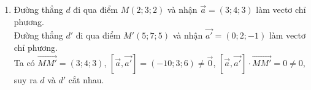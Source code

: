 \begin{vd}
{\begin{enumerate}
			Đường thẳng $d'$ đi qua điểm $M'(4;1;5)$ và nhận $\overrightarrow{a'}=(3;4;5)$ làm vectơ chỉ phương.\\
			Ta có $\overrightarrow{MM'}=(2;-2;4)$, $\left[ \overrightarrow{a}, \overrightarrow{a'} \right] = (14;-3;-6) \ne \overrightarrow{0}$, $\left[ \overrightarrow{a}, \overrightarrow{a'} \right] \cdot \overrightarrow{MM'} =10 \ne 0$, suy ra $d$ và $d'$ chéo nhau.
			\item Đường thẳng $d$ đi qua điểm $M(2;3;2)$ và nhận $\overrightarrow{a}=(3;4;3)$ làm vectơ chỉ phương.\\
			Đường thẳng $d'$ đi qua điểm $M'(5;7;5)$ và nhận $\overrightarrow{a'}=(0;2;-1)$ làm vectơ chỉ phương.\\
			Ta có $\overrightarrow{MM'}=(3;4;3)$, $\left[ \overrightarrow{a}, \overrightarrow{a'} \right] = (-10;3;6) \ne \overrightarrow{0}$, $\left[ \overrightarrow{a}, \overrightarrow{a'} \right] \cdot \overrightarrow{MM'} =0 \ne 0$, suy ra $d$ và $d'$ cắt nhau.
		\end{enumerate}
	}
\end{vd}

